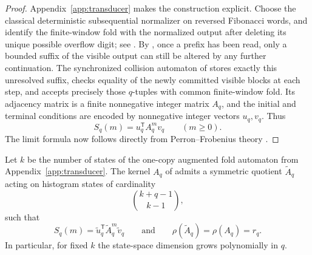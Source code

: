 \begin{proof}
Appendix~\ref{app:transducer} makes the construction explicit.  Choose the
classical deterministic subsequential normalizer on reversed Fibonacci words,
and identify the finite-window fold with the normalized output after deleting
its unique possible overflow digit; see
.  By
, once a prefix has been read, only a
bounded suffix of the visible output can still be altered by any further
continuation.  The synchronized collision automaton of
 stores exactly this unresolved suffix,
checks equality of the newly committed visible blocks at each step, and accepts
precisely those \(q\)-tuples with common finite-window fold.  Its adjacency
matrix is a finite nonnegative integer matrix \(A_q\), and the initial and
terminal conditions are encoded by nonnegative integer vectors \(u_q,v_q\).
Thus
\[
  S_q(m)=u_q^{\mathsf T}A_q^m v_q
  \qquad (m\ge 0).
\]
The limit formula now follows directly from Perron--Frobenius theory
\cite{Seneta2006}.
\end{proof}

\begin{theorem}
\label{thm:symmetric-compression}
Let \(k\) be the number of states of the one-copy augmented fold automaton from
Appendix~\ref{app:transducer}.  The kernel \(A_q\) of
 admits a symmetric quotient
\(\widetilde A_q\) acting on histogram states of cardinality
\[
  \binom{k+q-1}{k-1},
\]
such that
\[
  S_q(m)=\widetilde u_q^{\mathsf T}\widetilde A_q^m\widetilde v_q
  \qquad\text{and}\qquad
  \rho(\widetilde A_q)=\rho(A_q)=r_q.
\]
In particular, for fixed \(k\) the state-space dimension grows polynomially in
\(q\).
\end{theorem}

